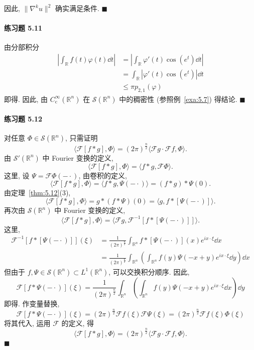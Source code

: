 因此, $\|\nabla^{k}u\|^{2}$ 确实满足条件. $\blacksquare$

\paragraph*{练习题 5.11}
由分部积分
\begin{align*}
\left|\int_{\mathbb{R}}f(t)\varphi(t)\dd t\right| &= \left|\int_{\mathbb{R}}\varphi'(t)\cos(e^{t})\dd t\right| \\
&= \int_{\mathbb{R}}|\varphi'(t)\cos(e^{t})|\dd t \\
&\leq \pi p_{2,1}(\varphi)
\end{align*}
即得. 因此, 由 $C_{\mathrm{c}}^{\infty}(\mathbb{R}^{n})$ 在 $\mathcal{S}(\mathbb{R}^{n})$ 中的稠密性 (参照例~\ref{exa:5.7}) 得结论. $\blacksquare$

\paragraph*{练习题 5.12}
对任意 $\Phi \in \mathcal{S}(\mathbb{R}^{n})$, 只需证明
\[
\langle\mathcal{F}[f*g], \Phi\rangle = (2\pi)^{\frac{n}{2}}\langle\mathcal{F}g \cdot \mathcal{F}f, \Phi\rangle.
\]
由 $\mathcal{S}'(\mathbb{R}^{n})$ 中 Fourier 变换的定义,
\[
\langle\mathcal{F}[f*g], \Phi\rangle = \langle f*g, \mathcal{F}\Phi\rangle.
\]
这里, 设 $\Psi = \mathcal{F}\Phi(-\cdot)$, 由卷积的定义,
\[
\langle\mathcal{F}[f*g], \Phi\rangle = \langle f*g, \Psi(-\cdot)\rangle = (f*g)*\Psi(0).
\]
由定理~\ref{thm:5.12}(3),
\[
\langle\mathcal{F}[f*g], \Phi\rangle = g*(f*\Psi)(0) = \langle g, f*[\Psi(-\cdot)]\rangle.
\]
再次由 $\mathcal{S}(\mathbb{R}^{n})$ 中 Fourier 变换的定义,
\[
\langle\mathcal{F}[f*g], \Phi\rangle = \langle\mathcal{F}g, \mathcal{F}^{-1}[f*[\Psi(-\cdot)]]\rangle.
\]
这里,
\begin{align*}
\mathcal{F}^{-1}[f*[\Psi(-\cdot)]](\xi) &= \frac{1}{(2\pi)^{\frac{n}{2}}}\int_{\mathbb{R}^{n}}f*[\Psi(-\cdot)](x)e^{ix \cdot \xi}\dd x \\
&= \frac{1}{(2\pi)^{\frac{n}{2}}}\int_{\mathbb{R}^{n}}\left(\int_{\mathbb{R}^{n}}f(y)\Psi(-x+y)e^{ix \cdot \xi}\dd y\right)\dd x
\end{align*}
但由于 $f, \Psi \in \mathcal{S}(\mathbb{R}^{n}) \subset L^{1}(\mathbb{R}^{n})$, 可以交换积分顺序. 因此,
\[
\mathcal{F}[f*\Psi(-\cdot)](\xi) = \frac{1}{(2\pi)^{\frac{n}{2}}}\int_{\mathbb{R}^{n}}\left(\int_{\mathbb{R}^{n}}f(y)\Psi(-x+y)e^{ix \cdot \xi}\dd x\right)\dd y
\]
即得. 作变量替换,
\[
\mathcal{F}[f*\Psi(-\cdot)](\xi) = (2\pi)^{\frac{n}{2}}\mathcal{F}f(\xi)\mathcal{F}\Psi(\xi) = (2\pi)^{\frac{n}{2}}\mathcal{F}f(\xi)\Phi(\xi)
\]
将其代入, 运用 $\mathcal{F}$ 的定义, 得
\[
\langle\mathcal{F}[f*g], \Phi\rangle = (2\pi)^{\frac{n}{2}}\langle\mathcal{F}g \cdot \mathcal{F}f, \Phi\rangle.
\]
$\blacksquare$

